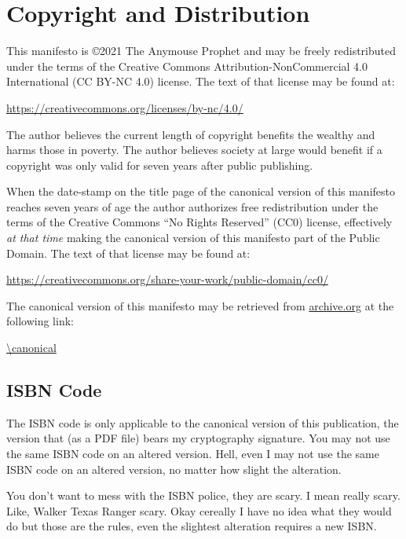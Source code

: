 \section{Copyright and Distribution}

This manifesto is \copyright 2021 The Anymouse Prophet and may be freely redistributed under the terms of the Creative Commons Attribution-NonCommercial 4.0 International (CC BY-NC 4.0) license. The text of that license may be found at:

\bigskip

\url{https://creativecommons.org/licenses/by-nc/4.0/}

\bigskip

\noindent The author believes the current length of copyright benefits the wealthy and harms those in poverty. The author believes society at large would benefit if a copyright was only valid for seven years after public publishing.

When the date-stamp on the title page of the canonical version of this manifesto reaches seven years of age the author authorizes free redistribution under the terms of the Creative Commons ``No Rights Reserved'' (CC0) license, effectively \emph{at that time} making the canonical version of this manifesto part of the Public Domain. The text of that license may be found at:

\bigskip

\url{https://creativecommons.org/share-your-work/public-domain/cc0/}

\bigskip

\noindent The canonical version of this manifesto may be retrieved from \url{archive.org} at the following link:

\bigskip

\url{\canonical}

\subsection{ISBN Code}

The ISBN code is only applicable to the canonical version of this publication, the version that (as a PDF file) bears my cryptography signature. You may not use the same ISBN code on an altered version. Hell, even I may not use the same ISBN code on an altered version, no matter how slight the alteration.

You don't want to mess with the ISBN police, they are scary. I mean really scary. Like, Walker Texas Ranger scary. Okay cereally I have no idea what they would do but those are the rules, even the slightest alteration requires a new ISBN.

